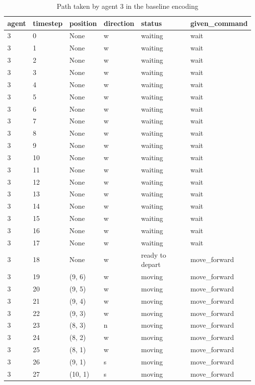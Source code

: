 \begin{table}[H]
  \centering
  \caption{Path taken by agent 3 in the baseline encoding}
  \label{tab:baseline3}
  \begin{tabular}{llllll}
    \toprule
    agent & timestep & position & direction & status & given\_command \\
    \midrule
3 & 0 & None & w & waiting & wait \\
3 & 1 & None & w & waiting & wait \\
3 & 2 & None & w & waiting & wait \\
3 & 3 & None & w & waiting & wait \\
3 & 4 & None & w & waiting & wait \\
3 & 5 & None & w & waiting & wait \\
3 & 6 & None & w & waiting & wait \\
3 & 7 & None & w & waiting & wait \\
3 & 8 & None & w & waiting & wait \\
3 & 9 & None & w & waiting & wait \\
3 & 10 & None & w & waiting & wait \\
3 & 11 & None & w & waiting & wait \\
3 & 12 & None & w & waiting & wait \\
3 & 13 & None & w & waiting & wait \\
3 & 14 & None & w & waiting & wait \\
3 & 15 & None & w & waiting & wait \\
3 & 16 & None & w & waiting & wait \\
3 & 17 & None & w & waiting & wait \\
3 & 18 & None & w & ready to depart & move\_forward \\
3 & 19 & (9, 6) & w & moving & move\_forward \\
3 & 20 & (9, 5) & w & moving & move\_forward \\
3 & 21 & (9, 4) & w & moving & move\_forward \\
3 & 22 & (9, 3) & w & moving & move\_forward \\
3 & 23 & (8, 3) & n & moving & move\_forward \\
3 & 24 & (8, 2) & w & moving & move\_forward \\
3 & 25 & (8, 1) & w & moving & move\_forward \\
3 & 26 & (9, 1) & s & moving & move\_forward \\
3 & 27 & (10, 1) & s & moving & move\_forward \\

\end{tabular}
\end{table}
